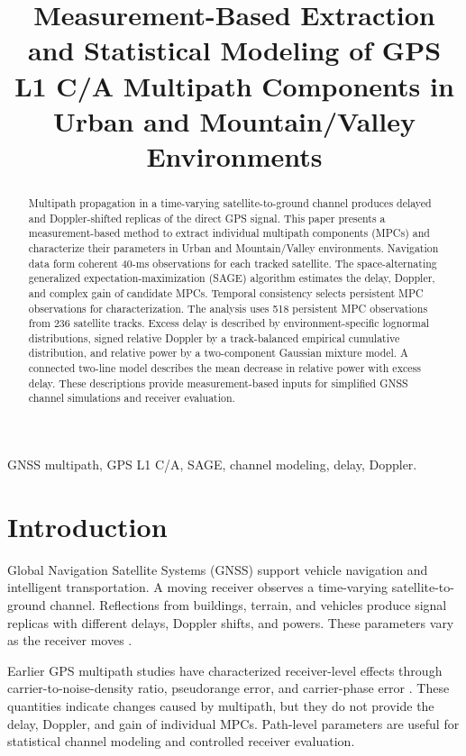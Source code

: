 \documentclass[conference]{IEEEtran}
\title{Measurement-Based Extraction and Statistical Modeling of GPS L1 C/A Multipath Components in Urban and Mountain/Valley Environments}
\author{\IEEEauthorblockN{Liang Feng}
\IEEEauthorblockA{Tongji University, Shanghai, China\\2432132@tongji.edu.cn}}
\begin{document}
\maketitle

\begin{abstract}
Multipath propagation in a time-varying satellite-to-ground channel produces delayed and Doppler-shifted replicas of the direct GPS signal. This paper presents a measurement-based method to extract individual multipath components (MPCs) and characterize their parameters in Urban and Mountain/Valley environments. Navigation data form coherent 40-ms observations for each tracked satellite. The space-alternating generalized expectation-maximization (SAGE) algorithm estimates the delay, Doppler, and complex gain of candidate MPCs. Temporal consistency selects persistent MPC observations for characterization. The analysis uses 518 persistent MPC observations from 236 satellite tracks. Excess delay is described by environment-specific lognormal distributions, signed relative Doppler by a track-balanced empirical cumulative distribution, and relative power by a two-component Gaussian mixture model. A connected two-line model describes the mean decrease in relative power with excess delay. These descriptions provide measurement-based inputs for simplified GNSS channel simulations and receiver evaluation.
\end{abstract}

\begin{IEEEkeywords}
GNSS multipath, GPS L1 C/A, SAGE, channel modeling, delay, Doppler.
\end{IEEEkeywords}

\section{Introduction}
Global Navigation Satellite Systems (GNSS) support vehicle navigation and intelligent transportation. A moving receiver observes a time-varying satellite-to-ground channel. Reflections from buildings, terrain, and vehicles produce signal replicas with different delays, Doppler shifts, and powers. These parameters vary as the receiver moves \cite{eissfeller1996gpsdynamic,mora1998multipath,beitler2015cmcd}.

Earlier GPS multipath studies have characterized receiver-level effects through carrier-to-noise-density ratio, pseudorange error, and carrier-phase error \cite{mora1998multipath,bilich2007snr,xie2011vehicular}. These quantities indicate changes caused by multipath, but they do not provide the delay, Doppler, and gain of individual MPCs. Path-level parameters are useful for statistical channel modeling and controlled receiver evaluation.
\end{document}
